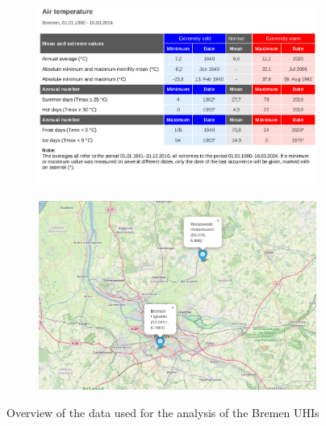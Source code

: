 \documentclass[12pt,a4paper, english]{article}
\begin{document}
  

    \begin{figure}[!p]
     \centering
       \begin{subfigure}[b]{\textwidth}
     \includegraphics[width=\textwidth]{img/DWDBremenWeather.jpg}
       \end{subfigure}

       \begin{subfigure}[b]{\textwidth}
        \includegraphics[width=\textwidth]{img/MapWetterstationenBremen.jpeg}
         \label{fig:mapWeatherstationsBremen}
       \end{subfigure}
         \caption{Overview of the data used for the analysis of the Bremen UHIs}\label{fig:AnalysisBre}
   \end{figure}
\end{document}

